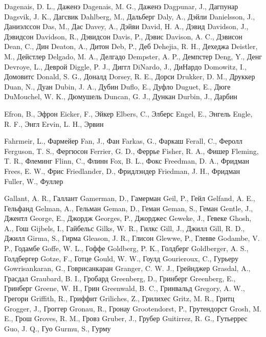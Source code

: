 Dagenais, D. L., Даженэ 
Dagenais, M. G., Даженэ
Dagpunar, J., Дагпунар
Dagsvik, J. K., Дагсвик
Dahlberg, M., Дальберг
Daly, A., Дэйли
Danielsson, J., Даниэлссон
Das, M., Дас
Davey, A., Дэйви
David, H. A., Дэвид
Davidson, J., Дэвидсон
Davidson, R., Дэвидсон 
Davis, P., Дэвис
Davison, A. C., Дэвисон
Dean, C., Дин
Deaton, A., Дитон
Deb, P., Деб 
Dehejia, R. H., Дехеджа
Deistler, M., Дейстлер
Delgado, M. A., Делгадо
Dempster, A. P., Демпстер
Deng, Y., Денг
Devroye, L., Деврой
Diggle, P. J., Диггл
DiNardo, J., ДиНардо
Domowitz, I., Домовитс
Donald, S. G., Доналд
Dorsey, R. E., Дорси
Drukker, D. M., Друккер
Duan, N., Дуан
Dubin, J. A., Дубин
Duflo, E., Дуфло
Duguet, E., Дюге
DuMouchel, W. K., Дюмушель
Duncan, G. J., Дункан
Durbin, J., Дарбин

Efron, B., Эфрон 
Eicker, F., Эйкер
Elbers, C., Элберс
Engel, E., Энгель
Engle, R. F., Энгл
Ervin, L. H., Эрвин

Fahrmeir, L., Фармейер
Fan, J., Фан
Farkas, G., Фаркаш
Ferall, C., Феролл
Ferguson, T. S., Фергюсон
Ferrier, G. D., Феррье
Fisher, R. A., Фишер
Fleming, T. R., Флеминг
Flinn, C., Флинн
Fox, B. L., Фокс
Freedman, D. A., Фридман
Frees, E. W., Фрис
Friedlander, D., Фридлэндер
Friedman, J. H., Фридман
Fuller, W., Фуллер

Gallant, A. R., Галлант
Gamerman, D., Гамерман
Geil, P., Гейл
Gelfand, A. E., Гельфанд
Gelman, A., Гельман 
Geman, D., Геман
Geman, S., Геман
Gentle, J., Джентл
George, E., Джордж
Georges, P., Джорджес
Geweke, J., Гевеке
Ghosh, A., Гош
Gijbels, I., Гайбельс
Gilks, W. R., Гилкс
Gill, J., Джилл
Gill, R. D., Джилл
Girma, S., Гирма
Gleason, J. R., Глисон
Glewwe, P., Глевве
Godambe, V. P., Годамбе
Goffe, W. L., Гоффе
Goldberg, P. K., Голдберг
Goldberger, A. S., Голдбергер
Gotze, F., Готце
Gould, W. W., Гоулд
Gourieroux, C., Гурьеру
Gowrisankaran, G., Говрисанкаран
Granger, C. W. J., Грейнджер
Grasdal, A., Грасдал
Graubard, B. I., Гробард
Greenberg, D., Гринберг
Greenberg, E., Гринберг
Greene, W. H., Грин
Greenwald, B. C., Гринвальд
Gregory, A. W., Грегори
Griffith, R., Гриффит
Griliches, Z., Грилихес
Gritz, M. R., Гритц
Grogger, J., Гроггер
Gronau, R., Гронау
Grootendorst, P., Грутендорст
Grosh, M. E., Грош
Groves, R. M., Гровз
Gruber, J., Грубер
Guitirrez, R. G., Гутьеррес
Guo, J. Q., Гуо 
Gurmu, S., Гурму

